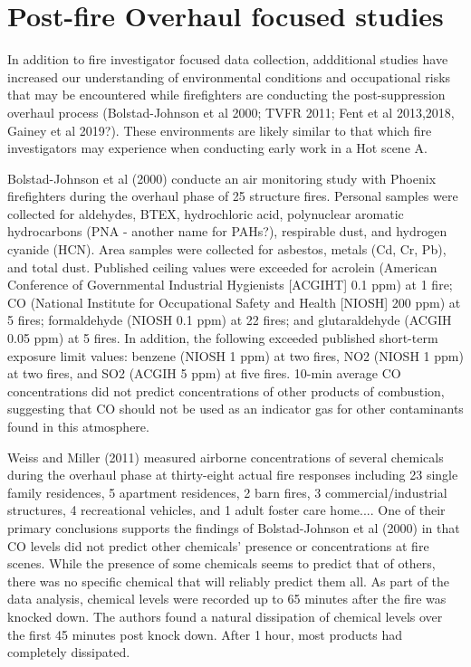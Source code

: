 \documentclass[12pt,oneside]{book}
\begin{document}
\section{Post-fire Overhaul focused studies}
In addition to fire investigator focused data collection, addditional studies have increased our understanding of environmental conditions and occupational risks that may be encountered while firefighters are conducting the post-suppression overhaul process (Bolstad-Johnson et al 2000; TVFR 2011; Fent et al 2013,2018, Gainey et al 2019?). These environments are likely similar to that which fire investigators may experience when conducting early work in a Hot scene A.

Bolstad-Johnson et al (2000) conducte an air monitoring study with Phoenix firefighters during the overhaul phase of 25 structure fires. Personal samples were collected for aldehydes, BTEX, hydrochloric acid, polynuclear aromatic hydrocarbons (PNA - another name for PAHs?), respirable dust, and hydrogen cyanide (HCN). Area samples were collected for asbestos, metals
(Cd, Cr, Pb), and total dust. Published ceiling values were exceeded for acrolein (American Conference of Governmental Industrial Hygienists [ACGIHT] 0.1 ppm) at 1 fire; CO (National Institute for Occupational Safety and Health [NIOSH] 200 ppm) at 5 fires; formaldehyde (NIOSH 0.1 ppm) at 22 fires; and glutaraldehyde (ACGIH 0.05 ppm) at 5 fires. In addition, the following exceeded published short-term exposure limit values: benzene (NIOSH 1 ppm) at two fires, NO2 (NIOSH 1 ppm) at two fires, and SO2 (ACGIH 5 ppm) at five fires. 10-min average CO concentrations did not predict concentrations of other products of combustion, suggesting that CO should not be used as an indicator gas for other contaminants found in this atmosphere.


Weiss and Miller (2011) measured airborne concentrations of several chemicals during the overhaul phase at thirty-eight actual fire responses including 23 single family residences, 5 apartment residences, 2 barn fires, 3 commercial/industrial structures, 4 recreational vehicles, and 1 adult foster care home.... One of their primary conclusions supports the findings of Bolstad-Johnson et al (2000) in that CO levels did not predict other chemicals’ presence or concentrations at fire scenes. While the presence of some chemicals seems to predict that of others, there was no specific chemical that will reliably predict them all.  As part of the data analysis, chemical levels were recorded up to 65 minutes after the fire was knocked down. The authors found a natural dissipation of chemical levels over the first 45 minutes post knock down. After 1 hour, most products had completely dissipated.
\end{document}
